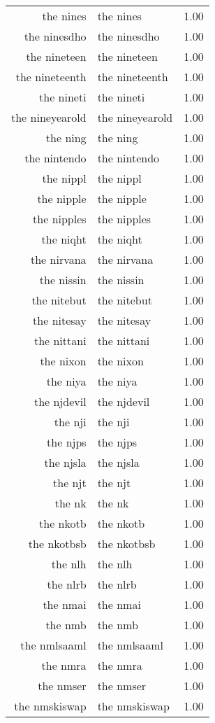 \begin{table}[ht]
\begin{tabular}{rlr}
  the nines & the nines & 1.00 \\ 
  the ninesdho & the ninesdho & 1.00 \\ 
  the nineteen & the nineteen & 1.00 \\ 
  the nineteenth & the nineteenth & 1.00 \\ 
  the nineti & the nineti & 1.00 \\ 
  the nineyearold & the nineyearold & 1.00 \\ 
  the ning & the ning & 1.00 \\ 
  the nintendo & the nintendo & 1.00 \\ 
  the nippl & the nippl & 1.00 \\ 
  the nipple & the nipple & 1.00 \\ 
  the nipples & the nipples & 1.00 \\ 
  the niqht & the niqht & 1.00 \\ 
  the nirvana & the nirvana & 1.00 \\ 
  the nissin & the nissin & 1.00 \\ 
  the nitebut & the nitebut & 1.00 \\ 
  the nitesay & the nitesay & 1.00 \\ 
  the nittani & the nittani & 1.00 \\ 
  the nixon & the nixon & 1.00 \\ 
  the niya & the niya & 1.00 \\ 
  the njdevil & the njdevil & 1.00 \\ 
  the nji & the nji & 1.00 \\ 
  the njps & the njps & 1.00 \\ 
  the njsla & the njsla & 1.00 \\ 
  the njt & the njt & 1.00 \\ 
  the nk & the nk & 1.00 \\ 
  the nkotb & the nkotb & 1.00 \\ 
  the nkotbsb & the nkotbsb & 1.00 \\ 
  the nlh & the nlh & 1.00 \\ 
  the nlrb & the nlrb & 1.00 \\ 
  the nmai & the nmai & 1.00 \\ 
  the nmb & the nmb & 1.00 \\ 
  the nmlsaaml & the nmlsaaml & 1.00 \\ 
  the nmra & the nmra & 1.00 \\ 
  the nmser & the nmser & 1.00 \\ 
  the nmskiswap & the nmskiswap & 1.00 \\ 

\end{tabular}
\end{table}

